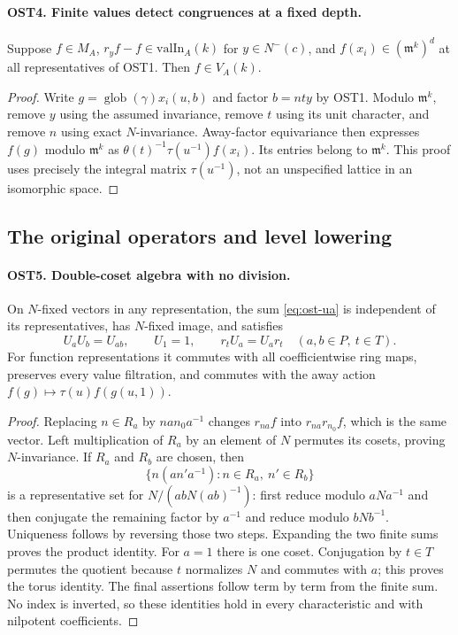 \documentclass[11pt,a4paper]{article}
\numberwithin{equation}{section}
\theoremstyle{remark}\newtheorem{remark}[theorem]{Remark}
\begin{document}
\paragraph{OST4. Finite values detect congruences at a fixed depth.}
\label{claim:OST4}
Suppose $f\in M_A$, $r_yf-f\in\mathrm{valIn}_A(k)$ for
$y\in N^-(c)$, and $f(x_i)\in(\mathfrak m^k)^d$ at all
representatives of OST1.  Then $f\in V_A(k)$.
\begin{proof}
Write $g=\operatorname{glob}(\gamma)x_i(u,\allowbreak{} b)$ and factor
$b=nty$ by OST1.  Modulo $\mathfrak m^k$, remove $y$ using
the assumed invariance, remove $t$ using its unit character,
and remove $n$ using exact $N$-invariance.  Away-factor
equivariance then expresses $f(g)$ modulo $\mathfrak m^k$ as
$\theta(t)^{-1}\tau(u^{-1})f(x_i)$.  Its entries belong to
$\mathfrak m^k$.  This proof uses precisely the integral matrix
$\tau(u^{-1})$, not an unspecified lattice in an isomorphic space.
\end{proof}

\subsection{The original operators and level lowering}

\paragraph{OST5. Double-coset algebra with no division.}
\label{claim:OST5}
On $N$-fixed vectors in any representation, the sum
\eqref{eq:ost-ua} is independent of its representatives, has
$N$-fixed image, and satisfies
\[
 U_aU_b=U_{ab},\qquad U_1=1,\qquad r_tU_a=U_a r_t
                    \quad(a,\allowbreak{} b\in P,\ t\in T).
\]
For function representations it commutes with all coefficientwise
ring maps, preserves every value filtration, and commutes with
the away action $f(g)\mapsto\tau(u)f(g(u,1))$.
\begin{proof}
Replacing $n\in R_a$ by $n a n_0a^{-1}$ changes
$r_{na}f$ into $r_{na}r_{n_0}f$, which is the same vector.
Left multiplication of $R_a$ by an element of $N$ permutes its
cosets, proving $N$-invariance.  If $R_a$ and $R_b$ are chosen,
then
\[
             \{n(a n'a^{-1}):n\in R_a,\ n'\in R_b\}
\]
is a representative set for $N/(abN(ab)^{-1})$: first reduce
modulo $aNa^{-1}$ and then conjugate the remaining factor by
$a^{-1}$ and reduce modulo $bNb^{-1}$.  Uniqueness follows
by reversing those two steps.  Expanding the two finite sums
proves the product identity.  For $a=1$ there is one coset.
Conjugation by $t\in T$ permutes the quotient because $t$
normalizes $N$ and commutes with $a$; this proves the torus
identity.  The final assertions follow term by term from the
finite sum.  No index is inverted, so these identities hold in
every characteristic and with nilpotent coefficients.
\end{proof}
\end{document}
